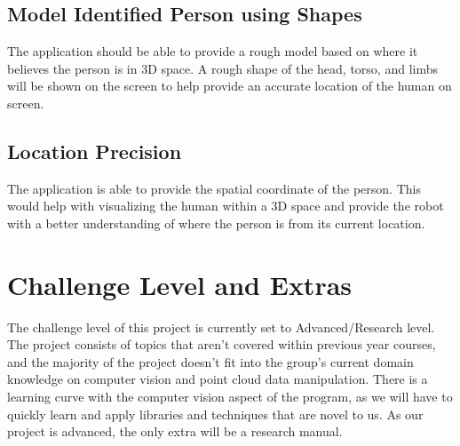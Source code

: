 \documentclass{article}
\begin{document}
\subsection{Model Identified Person using Shapes}
The application should be able to provide a rough model based on where it believes the person is in 3D space. A rough shape of the head, torso, and limbs will be shown on the screen to help provide an accurate location of the human on screen.

\subsection{Location Precision}
The application is able to provide the spatial coordinate of the person. This would help with visualizing the human within a 3D space and provide the robot with a better understanding of where the person is from its current location.

\section{Challenge Level and Extras}

The challenge level of this project is currently set to Advanced/Research level. The project consists of topics 
that aren't covered within previous year courses, and the majority of the project doesn't fit into the group's current domain knowledge on computer vision and point cloud data manipulation. 
There is a learning curve with the computer vision aspect of the program, as we will have to quickly learn and apply libraries and techniques that are novel to us. As our project is advanced, the only extra will be a research manual.


\newpage{}
\end{document}
